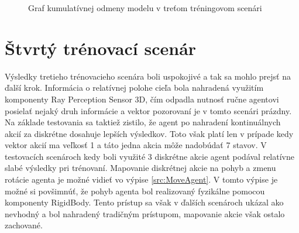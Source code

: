 \documentclass[slovak, master]{diploma}
\begin{document}
\begin{figure}[!htbp]
    \centering
    \caption{Graf kumulatívnej odmeny modelu v treťom tréningovom scenári}
    \label{plt:thirdcenario}
\end{figure}

\section{Štvrtý trénovací scenár}
\label{sec:FourthScenario}
Výsledky tretieho trénovacieho scenára boli uspokojivé a tak sa mohlo prejsť na ďalší krok. Informácia o relatívnej polohe cieľa bola nahradená využitím komponenty Ray Perception Sensor 3D, čím odpadla nutnosť ručne agentovi posielať nejaký druh informácie a vektor pozorovaní je v tomto scenári prázdny. Na základe testovania sa taktiež zistilo, že agent po nahradení kontinuálnych akcií za diskrétne dosahuje lepších výsledkov. Toto však platí len v prípade kedy vektor akcií ma veľkosť 1 a táto jedna akcia môže nadobúdať 7 stavov. V testovacích scenároch kedy boli využité 3 diskrétne akcie agent podával relatívne slabé výsledky pri trénovaní. Mapovanie diskrétnej akcie na pohyb a zmenu rotácie agenta je možné vidieť vo výpise \ref{src:MoveAgent}. V tomto výpise je možné si povšimnúť, že pohyb agenta bol realizovaný fyzikálne pomocou komponenty RigidBody. Tento prístup sa však v ďalších scenároch ukázal ako nevhodný a bol nahradený tradičným prístupom, mapovanie akcie však ostalo zachované.
\end{document}
